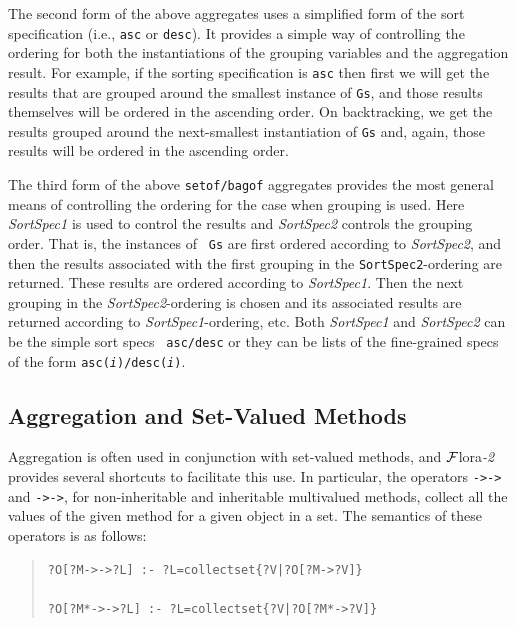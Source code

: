 \documentclass[11pt]{article}
\newcommand{\FLORA}{{\mbox{\sc ${\cal F}${lora}\rm\emph{-2}}}\xspace}
\begin{document}
The second form of the above aggregates uses a simplified form of the sort
specification (i.e., {\tt asc} or {\tt desc}). It provides a simple way of
controlling the ordering for both the instantiations of the grouping variables  
and the aggregation result. For example, if the sorting specification is
{\tt asc} then first we will get the results that are grouped around the
smallest instance of {\tt Gs}, and those results themselves will be ordered
in the ascending order. On backtracking, we get the results grouped around
the next-smallest instantiation of {\tt Gs} and, again, those results will
be ordered in the ascending order.

The third form of the above {\tt setof/bagof} aggregates provides the most
general means of controlling the ordering for the case when grouping is
used. Here {\it SortSpec1} is used to control the results and {\it
  SortSpec2} controls the grouping order.  That is, the instances of {\tt
  Gs} are first ordered according to {\it SortSpec2}, and then the results
associated with the first grouping in the {\tt SortSpec2}-ordering are
returned. These results are ordered according to {\it SortSpec1}. Then the
next grouping in the \emph{SortSpec2}-ordering is chosen and its associated
results are returned according to {\it SortSpec1}-ordering, etc. 
Both {\it SortSpec1} and {\it SortSpec2} can be the simple sort specs {\tt
  asc/desc}  or they can be lists of the
fine-grained specs of the form
{\tt asc({\it i})/desc({\it i})}.


\subsection {Aggregation and Set-Valued Methods}

\index{{\tt ->->}}
\index{{\tt *->->}}
Aggregation is often used in conjunction with set-valued methods, and
\FLORA provides several shortcuts to facilitate this use.
In particular, the operators
{\tt ->->} and {\tt *->->}, for non-inheritable and
inheritable multivalued methods, collect all the values of the given
method for a given object in a set. The semantics of these operators is
as follows:

\begin{quote}
\begin{verbatim}
?O[?M->->?L] :- ?L=collectset{?V|?O[?M->?V]}

?O[?M*->->?L] :- ?L=collectset{?V|?O[?M*->?V]}
\end{verbatim}
\end{quote}
\end{document}
